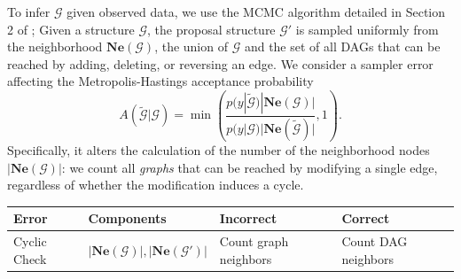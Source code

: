 \documentclass{article}
\begin{document}
To infer $\mathcal{G}$ given observed data, we use the MCMC algorithm detailed in Section 2 of \cite{grzegorczyk_improving_2008}; 
Given a structure $\mathcal{G}$, the proposal structure $\mathcal{G}'$ is sampled uniformly from the neighborhood $\mathbf{Ne}(\mathcal{G})$, the union of $\mathcal{G}$ and the set of all DAGs that can be reached by adding, deleting, or reversing an edge. 
We consider a sampler error affecting the Metropolis-Hastings acceptance probability
\begin{equation}
A(\tilde{\mathcal{G}}|\mathcal{G}) = \min{\left(\frac{p(y|\tilde{\mathcal{G}})|\mathbf{Ne}(\mathcal{G})|}{p(y|\mathcal{G})|\mathbf{Ne}(\tilde{\mathcal{G}})|}, 1\right)}. \label{eq:exp_graph_mh}
\end{equation}
Specifically, it alters the calculation of the number of the neighborhood nodes $|\mathbf{Ne}(\mathcal{G})|$: we count all \textit{graphs} that can be reached by modifying a single edge, regardless of whether the modification induces a cycle. 
\begin{center}
    \begin{tabular}{llll}
    Error & Components & Incorrect & Correct \\
    \midrule  
         Cyclic Check & $|\mathbf{Ne}(\mathcal{G})|, |\mathbf{Ne}(\mathcal{G}')|$ & Count graph neighbors & Count DAG neighbors \\
    \end{tabular}
\end{center}

\end{document}
